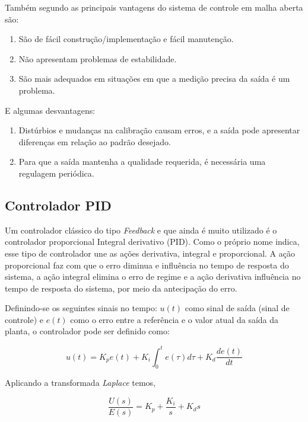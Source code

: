 Também segundo \cite{ogata2011engenharia} as principais vantagens do sistema de controle em malha aberta são:
\begin{enumerate}
    \item São de fácil construção/implementação e fácil manutenção.
    \item Não apresentam problemas de estabilidade.
    \item São mais adequados em situações em que a medição precisa da saída é um problema.
\end{enumerate}

E algumas desvantagens:

\begin{enumerate}
    \item Distúrbios e mudanças na calibração causam erros, e a saída pode apresentar diferenças
    em relação ao padrão desejado.
    \item Para que a saída mantenha a qualidade requerida, é necessária uma regulagem periódica.
\end{enumerate}


\subsection{Controlador PID}
Um controlador clássico do tipo \emph{Feedback} e que ainda é muito utilizado é o controlador proporcional Integral derivativo (PID). Como o próprio nome indica, esse tipo de controlador une as ações derivativa, integral e proporcional. A ação proporcional faz com que o erro diminua e influência no tempo de resposta do sistema, a ação integral elimina o erro de regime e a ação derivativa influência no tempo de resposta do sistema, por meio da antecipação do erro.

Definindo-se os seguintes sinais no tempo: $u(t)$ como sinal de saída (sinal de controle) e $e(t)$ como o erro entre a referência e o valor atual da saída da planta, o controlador pode ser definido como:

\begin{equation}
    u(t) = K_{p}e(t) + K_{i} \int^{t}_{0}e(\tau)d\tau + K_{d}\frac{d e(t)}{dt}
\end{equation}

Aplicando a transformada \emph{Laplace} temos,

\begin{equation}
    \frac{U(s)}{E(s)} = K_{p} + \frac{K_{i}}{s} + K_{d}s
\end{equation}

